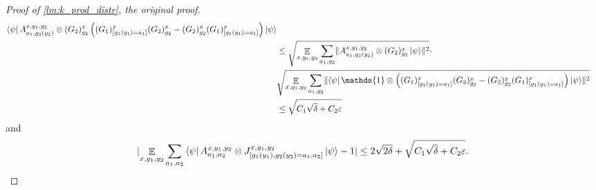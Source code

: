 \documentclass[10pt,a4paper]{article}
\theoremstyle{plain}
\theoremstyle{definition}
\DeclarePairedDelimiter{\norm}{\lVert}{\rVert}
\DeclarePairedDelimiter{\abs}{\lvert}{\rvert}
\newcommand {\bra} [1] {\ensuremath{ \left\langle #1 \right| }}
\newcommand {\ket} [1] {\ensuremath{ \left| #1 \right\rangle }}
\DeclareMathOperator*{\bigE}{\mathbb{E}}
\newcommand {\id} {\ensuremath{\mathds{1}}}
\newcommand{\ep} {\ensuremath{\varepsilon}}
\newcommand{\x}{\otimes}
\newcommand{\1}{\mathbb{1}} %
\begin{document}
\begin{proof}[Proof of \cref{lm:k_prod_distr}, the original proof]
\begin{align*}
{		\bra{\psi} A^{x,y_1,y_2}_{a_1,g_2(y_2) } \x 
		(G_2)^x_{g_2}  \left(  (G_1)^x_{[g_1(y_1) = a_1]}(G_2)^x_{g_2} - (G_2)^x_{g_2}(G_1)^x_{[g_1(y_1) = a_1]} \right)  \ket{\psi} } \\
	& \leq \sqrt{  \bigE_{x,y_1,y_2} \sum_{a_1, g_2} \norm{  A^{x,y_1,y_2}_{a_1,g_2(y_2) } \x 
		(G_2)^x_{g_2} \ket{\psi}}^2} \cdot \\
		&\sqrt{ \bigE_{x,y_1,y_2} \sum_{a_1, g_2} \norm{ \bra{\psi} \id\x \left(  (G_1)^x_{[g_1(y_1) = a_1]}(G_2)^x_{g_2} - (G_2)^x_{g_2}(G_1)^x_{[g_1(y_1) = a_1]} \right)  \ket{\psi}}^2} \\
		&\leq \sqrt{ C_1 \sqrt{\delta} + C_2\ep}
	\end{align*}
	and
	\begin{align*}
		\abs{	\bigE_{x,y_1,y_2} \sum_{a_1, a_2} \bra{\psi} A^{x,y_1,y_2}_{a_1,a_2} \x J^{x,y_1,y_2}_{[g_1(y_1),g_2(y_2) = a_1, a_2]} \ket{\psi}-1}
		\leq 2\sqrt{2\delta} + \sqrt{ C_1 \sqrt{\delta} + C_2\ep}.
	\end{align*}
	

\end{proof}
\end{document}
